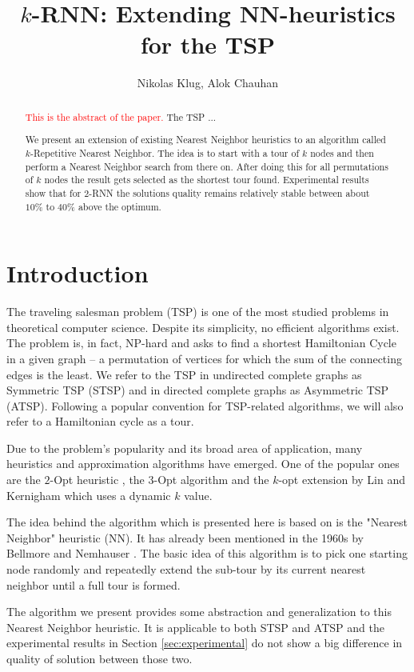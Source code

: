 \documentclass[11pt]{article}
\title{$k$-RNN: Extending NN-heuristics for the TSP}
\author{Nikolas Klug, Alok Chauhan}
\newcommand{\red}{\textcolor{red}}
\begin{document}
	\maketitle
	\begin{abstract}
		\red{This is the abstract of the paper.}
		The TSP ...
		
		We present an extension of existing Nearest Neighbor heuristics to an algorithm called $k$-Repetitive Nearest Neighbor. 
		The idea is to start with a tour of $k$ nodes and then perform a Nearest Neighbor search from there on. 
		After doing this for all permutations of $k$ nodes the result gets selected as the shortest tour found. 
		Experimental results show that for $2$-RNN the solutions quality remains relatively stable between about $10\%$ to $40\%$ above the optimum.
	\end{abstract}

	\section{Introduction}
	\label{sec:introduction}
	The traveling salesman problem (TSP) is one of the most studied problems in theoretical computer science. 
	Despite its simplicity, no efficient algorithms exist. 
	The problem is, in fact, NP-hard and asks to find a shortest Hamiltonian Cycle in a given graph -- a permutation of vertices for which the sum of the connecting edges is the least.
	We refer to the TSP in undirected complete graphs as Symmetric TSP (STSP) and in directed complete graphs as Asymmetric TSP (ATSP).
	Following a popular convention for TSP-related algorithms, we will also refer to a Hamiltonian cycle as a tour. 	

	Due to the problem's popularity and its broad area of application, many heuristics and approximation algorithms have emerged. One of the popular ones are the $2$-Opt heuristic \cite{CROES1958}, the $3$-Opt algorithm \cite{LIN1965} and the $k$-opt extension by Lin and Kernigham \cite{LIN1973} which uses a dynamic $k$ value.
	
	The idea behind the algorithm which is presented here is based on is the "Nearest Neighbor" heuristic (NN).
	It has already been mentioned in the 1960s by Bellmore and Nemhauser \cite{BELLMORE1968}.
	The basic idea of this algorithm is to pick one starting node randomly and repeatedly extend the sub-tour by its current nearest neighbor until a full tour is formed.
	
	The algorithm we present provides some abstraction and generalization to this Nearest Neighbor heuristic. 
	It is applicable to both STSP and ATSP and the experimental results in Section \ref{sec:experimental} do not show a big difference in quality of solution between those two.
	
\end{document}
